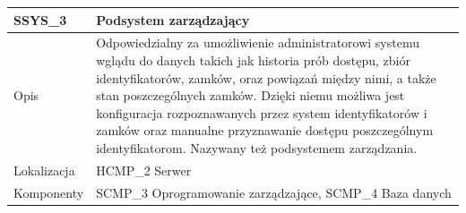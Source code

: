 \begin{table}
\begin{subtable}[c]{\textwidth}
                    \end{subtable}
                \quad%
                    \begin{subtable}[c]{\textwidth}
                        \centering
                        \begin{tabular}{|p{2cm}|p{12cm}|}
                            \hline SSYS\_3      & \textbf{Podsystem zarządzający} \\
                            \hline \cellcolor[gray]{0.8} Opis         & Odpowiedzialny za umożliwienie administratorowi systemu wglądu do danych takich jak historia prób dostępu, zbiór identyfikatorów, zamków, oraz powiązań między nimi, a także stan poszczególnych zamków. Dzięki niemu możliwa jest konfiguracja rozpoznawanych przez system identyfikatorów i zamków oraz manualne przyznawanie dostępu poszczególnym identyfikatorom. Nazywany też podsystemem zarządzania. \\
                            \hline \cellcolor[gray]{0.8} Lokalizacja  & HCMP\_2 Serwer    \\
                            \hline \cellcolor[gray]{0.8} Komponenty   & SCMP\_3 Oprogramowanie zarządzające, SCMP\_4 Baza danych \\
                            \hline
                        \end{tabular}
                        \label{tbl:ssys3}      
                    \end{subtable}                 
                    \label{tbl:subsystems}
                \end{table}


